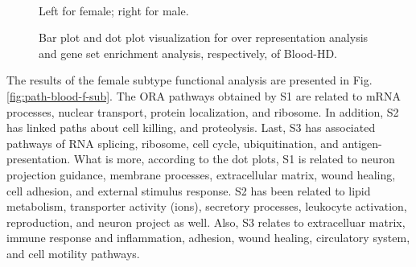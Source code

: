 \begin{figure}[!ht]%
    \centering
    \qquad
    \\
    \qquad
\caption{Bar plot and dot plot visualization for over representation analysis and gene set enrichment analysis, respectively, of Blood-HD.}
\footnotesize Left for female; right for male.
\label{fig:path-blood-hd}%
\end{figure}

The results of the female subtype functional analysis are presented in Fig. \ref{fig:path-blood-f-sub}. The ORA pathways obtained by S1 are related to mRNA processes, nuclear transport, protein localization, and ribosome. In addition, S2 has linked paths about cell killing, and proteolysis. Last, S3 has associated pathways of RNA splicing, ribosome, cell cycle, ubiquitination, and antigen-presentation. What is more, according to the dot plots, S1 is related to neuron projection guidance, membrane processes, extracellular matrix, wound healing, cell adhesion, and external stimulus response. S2 has been related to lipid metabolism, transporter activity (ions), secretory processes, leukocyte activation, reproduction, and neuron project as well. Also, S3 relates to extracelluar matrix, immune response and inflammation, adhesion, wound healing, circulatory system, and cell motility pathways.

